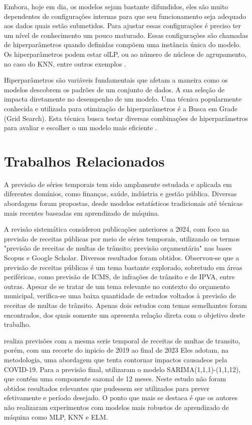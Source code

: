 \documentclass[12pt]{tcc}
\begin{document}
Embora, hoje em dia, os modelos sejam bastante difundidos, eles são muito dependentes de configurações internas para que seu funcionamento seja adequado aos dados quais estão submetidos. Para ajustar essas configurações é preciso ter um nível de conhecimento um pouco maturado\citep{koutsoukas2017deep}. Essas configurações são chamadas de hiperparâmetros  quando definidas compõem uma instância única do modelo. Os hiperparâmetros podem estar olLP, ou ao número de núcleos de agrupamento, no caso do KNN, entre outros exemplos \citep{ogasawara_event_2025}.

Hiperparâmetros são variáveis fundamentais que afetam a maneira como os modelos descobrem os padrões de um conjunto de dados. A sua seleção de impacta diretamente no desempenho de um modelo. Uma técnica popularmente conhecida e utilizada para otimização de hiperparâmetros é a Busca em Grade (Grid Search). Esta técnica busca testar diversas combinações de hiperparâmetros para avaliar e escolher o um modelo mais eficiente \citep{monica2024Hyperparameter, ramamohan2024discrete}. 

\chapter{Trabalhos Relacionados}
\label{sec:trabalhos_relacionados}

A previsão de séries temporais tem sido amplamente estudada e aplicada em diferentes domínios, como finanças, saúde, indústria e gestão pública. Diversas abordagens foram propostas, desde modelos estatísticos tradicionais até técnicas mais recentes baseadas em aprendizado de máquina.

A revisão sistemática considerou publicações anteriores a 2024, com foco na previsão de receitas públicas por meio de séries temporais, utilizando os termos "previsão de receitas de multas de trânsito; previsão orçamentária" nas bases Scopus e Google Scholar. Diversos resultados foram obtidos. Observou-se que a previsão de receitas públicas é um tema bastante explorado, sobretudo em áreas periféricas, como previsão de ICMS, de infrações de trânsito e de IPVA, entre outras. Apesar de se tratar de um tema relevante no contexto do orçamento municipal, verifica-se uma baixa quantidade de estudos voltados à previsão de receitas de multas de trânsito. Apenas dois estudos com temas semelhantes foram encontrados, dos quais somente um apresenta relação direta com o objetivo deste trabalho.

\citet{pucrjreceitas} realiza previsões com a mesma serie temporal de receitas de multas de transito, porém, com um recorte do inpicio de 2019 ao final de 2023 Eles adotam, na metodologia, uma abordagem que tenta contornar impactos causadeos pela COVID-19. Para a previsão final, utilizaram o modelo SARIMA(1,1,1)-(1,1,12), que contém uma componente sazonal de 12 meses. Neste estudo não foram obtidos resultados relevantes que pudessem ser utilizados para prever efetivamente e período desejado. O ponto que mais se destaca é que os autores não realizaram experimentos com modelos mais robustos de aprendizado de máquina como MLP, KNN e ELM.
\end{document}
